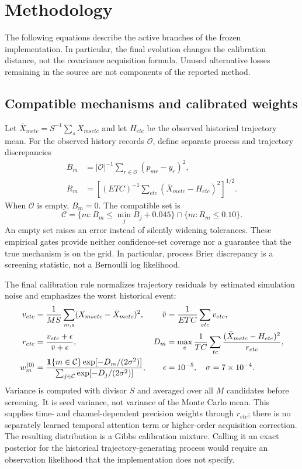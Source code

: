 \section{Methodology}
\label{sec:method}
The following equations describe the active branches of the frozen implementation. In particular, the final evolution changes the calibration distance, not the covariance acquisition formula. Unused alternative losses remaining in the source are not components of the reported method.

\subsection{Compatible mechanisms and calibrated weights}
Let $\bar X_{metc}=S^{-1}\sum_sX_{msetc}$ and let $H_{etc}$ be the observed historical trajectory mean. For the observed history records $\mathcal O$, define separate process and trajectory discrepancies
\begin{align}
 B_m&=|\mathcal O|^{-1}\sum_{r\in\mathcal O}(p_{mr}-y_r)^2,\nonumber\\
 R_m&=\left[(ETC)^{-1}\sum_{etc}(\bar X_{metc}-H_{etc})^2\right]^{1/2}.
 \label{eq:compaterrors}
\end{align}
When $\mathcal O$ is empty, $B_m=0$. The compatible set is
\begin{equation}
 \mathcal C=\{m:B_m\leq\min_j B_j+0.045\}\cap\{m:R_m\leq0.10\}.
 \label{eq:set}
\end{equation}
An empty set raises an error instead of silently widening tolerances. These empirical gates provide neither confidence-set coverage nor a guarantee that the true mechanism is on the grid. In particular, process Brier discrepancy is a screening statistic, not a Bernoulli log likelihood.

The final calibration rule normalizes trajectory residuals by estimated simulation noise and emphasizes the worst historical event:
\begin{align}
 v_{etc}&=\frac1{MS}\sum_{m,s}(X_{msetc}-\bar X_{metc})^2,
 &\bar v&=\frac1{ETC}\sum_{etc}v_{etc},\nonumber\\
 r_{etc}&=\frac{v_{etc}+\epsilon}{\bar v+\epsilon},
 &D_m&=\max_e\frac1{TC}\sum_{tc}\frac{(\bar X_{metc}-H_{etc})^2}{r_{etc}},\label{eq:distance}\\
 w_m^{(0)}&=\frac{\mathbf{1}\{m\in\mathcal C\}\exp[-D_m/(2\sigma^2)]}
 {\sum_{j\in\mathcal C}\exp[-D_j/(2\sigma^2)]},
 &\epsilon&=10^{-5},\quad\sigma=7\times10^{-4}.\label{eq:weights}
\end{align}
Variance is computed with divisor $S$ and averaged over all $M$ candidates before screening. It is seed variance, not variance of the Monte Carlo mean. This supplies time- and channel-dependent precision weights through $r_{etc}$; there is no separately learned temporal attention term or higher-order acquisition correction. The resulting distribution is a Gibbs calibration mixture. Calling it an exact posterior for the historical trajectory-generating process would require an observation likelihood that the implementation does not specify.

